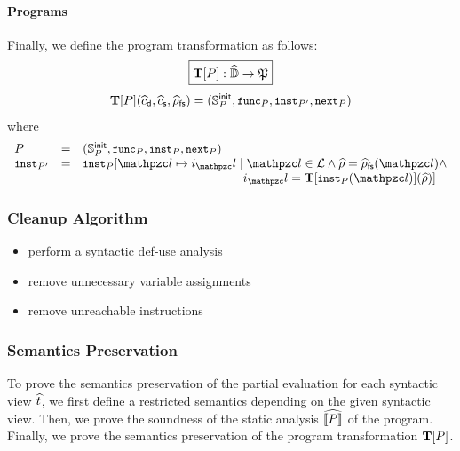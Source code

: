 \paragraph{Programs} Finally, we define the program transformation as follows:
\[
  \framebox{$\transform{\prog}: \aelemset \rightarrow \progset$}
\]
\[
  \textbf{T}[P](\widehat{c}_{\textsf{d}}, \widehat{c}_{\textsf{s}}, \widehat{\rho}_{\textsf{fs}}) = (\mathbb{S}^{\textsf{init}}_{P},
  {\small \texttt{func}}_{P}, {\small \texttt{inst}}_{P'}, {\small \texttt{next}}_{P})
\]
where
\[
  \begin{array}{lcl}
    \prog &=&
    (\initstset{\prog}, \getfunc{\prog}, \getinst{\prog}, \getnext{\prog})\\

    \getinst{\prog'} &=&
    \getinst{\prog}[\lab \mapsto \inst_\lab \mid
    \lab \in \labset \wedge \aenv = \afsenv(\lab) \wedge\\&&

    \phantom{\getinst{\prog}[\lab \mapsto \inst_\lab \mid}
    \inst_\lab = \transform{\getinst{\prog}(\lab)}(\aenv)]\\
  \end{array}
\]



\subsubsection{Cleanup Algorithm}

\todo

\begin{itemize}
  \item perform a syntactic def-use analysis
  \item remove unnecessary variable assignments
  \item remove unreachable instructions
\end{itemize}


\subsubsection{Semantics Preservation}

To prove the semantics preservation of the partial evaluation for each syntactic
view $\widehat{t}$, we first define a restricted semantics depending on the given
syntactic view. Then, we prove the soundness of the static analysis
$\widehat{\llbracket{P}\rrbracket}$ of the program. Finally, we prove the semantics preservation of
the program transformation $\textbf{T}[P]$.


